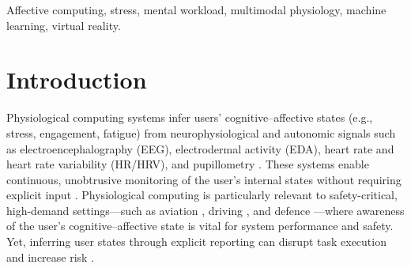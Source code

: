 \documentclass[lettersize,journal]{IEEEtran}
\begin{document}
\begin{IEEEkeywords}
Affective computing, stress, mental workload, multimodal physiology, machine learning, virtual reality.
\end{IEEEkeywords}



\section{Introduction}

Physiological computing systems infer users’ cognitive–affective states (e.g., stress, engagement, fatigue) from neurophysiological and autonomic signals such as electroencephalography (EEG), electrodermal activity (EDA), heart rate and heart rate variability (HR/HRV), and pupillometry \cite{faircloughFundamentalsPhysiologicalComputing2009, dehaisNeuroergonomicsApproachMental2020, alimardaniPassiveBrainComputerInterfaces2020, markMentalWorkloadAssessment2024}. These systems enable continuous, unobtrusive monitoring of the user’s internal states without requiring explicit input \cite{aricoAdaptiveAutomationTriggered2016, dehaisNeuroergonomicsApproachMental2020, meteierClassificationDriversWorkload2021, alimardaniPassiveBrainComputerInterfaces2020}. Physiological computing is particularly relevant to safety-critical, high-demand settings—such as aviation \cite{dehaisDualPassiveReactive2022}, driving \cite{meteierClassificationDriversWorkload2021, masiStressWorkloadAssessment2023}, and defence \cite{liuReviewEmotionRecognition2021, huttunenEffectCognitiveLoad2011}—where awareness of the user’s cognitive–affective state is vital for system performance and safety. Yet, inferring user states through explicit reporting can disrupt task execution and increase risk \cite{zanderPassiveBraincomputerInterfaces2011, dehaisNeuroergonomicsApproachMental2020, dehaisDualPassiveReactive2022}.
\end{document}
